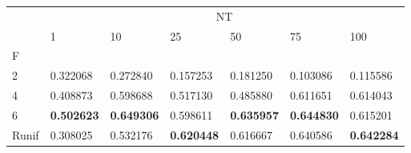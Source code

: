 \begin{table}[htbp]
\centering
\label{nursery-results}
\begin{tabular}{lllllll}
\toprule
 & \multicolumn{6}{c}{NT} \\
 & 1 & 10 & 25 & 50 & 75 & 100 \\
F &  &  &  &  &  &  \\
\midrule
2 & 0.322068 & 0.272840 & 0.157253 & 0.181250 & 0.103086 & 0.115586 \\
4 & 0.408873 & 0.598688 & 0.517130 & 0.485880 & 0.611651 & 0.614043 \\
6 & \textbf{0.502623} & \textbf{0.649306} & 0.598611 & \textbf{0.635957} & \textbf{0.644830} & 0.615201 \\
Runif & 0.308025 & 0.532176 & \textbf{0.620448} & 0.616667 & 0.640586 & \textbf{0.642284} \\
\bottomrule
\end{tabular}
\end{table}
